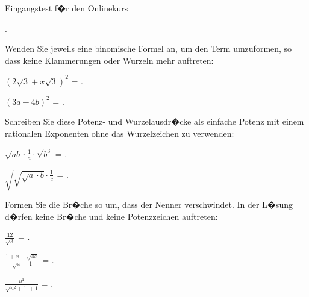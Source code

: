 \begin{MTest}{Eingangstest f�r den Onlinekurs}
\begin{MExercise}
.
\end{MExercise}

\begin{MExercise}
Wenden Sie jeweils eine binomische Formel an, um den Term umzuformen, so dass keine Klammerungen oder Wurzeln mehr auftreten:
\begin{MExerciseItems}
\item{$(2\sqrt3+x\sqrt3)^2$ = .}
\item{$(3a-4b)^2$ = .}
\end{MExerciseItems}
\end{MExercise}

\begin{MExercise}
Schreiben Sie diese Potenz- und Wurzelausdr�cke als einfache Potenz mit einem rationalen Exponenten ohne das Wurzelzeichen zu verwenden:
\begin{MExerciseItems}
\item{$\sqrt{a b}\cdot \frac1{a}\cdot \sqrt{b^{3}}$ = .}
\item{$\sqrt{\sqrt{\sqrt{a}\cdot b}\cdot\frac1c}$ = .}
\end{MExerciseItems}
\end{MExercise}

\begin{MExercise}
Formen Sie die Br�che so um, dass der Nenner verschwindet. In der L�sung d�rfen keine Br�che und keine Potenzzeichen auftreten:
\begin{MExerciseItems}
\item{$\frac{12}{\sqrt{3}}$ = .}
\item{$\frac{1+x-\sqrt{4x}}{\sqrt{x}-1}$ = .}
\item{$\frac{u^3}{\sqrt{u^2+1}+1}$ = .}
\end{MExerciseItems}
\end{MExercise}


\end{MTest}
